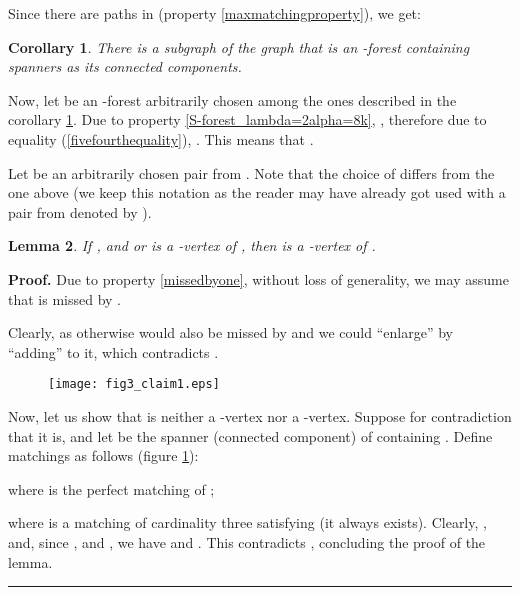 \documentclass[a4paper, 12pt]{article}
\newtheorem{lemma}{Lemma}[subsection]
\newtheorem{corollary}[lemma]{Corollary}
\newenvironment{proof}[1][Proof]{\noindent\textbf{#1.} }{\ \rule{0.5em}{0.5em}}
\begin{document}
Since there are  paths in 
(property \ref{maxmatchingproperty}), we get:
\begin{corollary}\label{subgraph_F}
There is a subgraph  of the graph  that is an -forest
containing  spanners as its connected
components.
\end{corollary}

 Now, let  be an -forest arbitrarily chosen among the ones described in the corollary \ref{subgraph_F}.
 Due to property \ref{S-forest_lambda=2alpha=8k}, , therefore due to equality (\ref{fivefourthequality}), . This means that .

\bigskip

Let  be an arbitrarily chosen pair from . Note that the choice of  differs from the one above
(we keep this notation as the reader may have already got used with
a pair from  denoted by ).

\vspace*{0.4cm}

\begin{lemma} \label{mandatory3-vertex}
If , and  or  is a
-vertex of , then  is a -vertex of .
\end{lemma}
\begin{proof}
Due to property \ref{missedbyone}, without loss of generality, we
may assume that  is missed by .

Clearly,  as otherwise  would also be missed by 
and we could ``enlarge''  by ``adding''  to it, which
contradicts .

\begin{figure}[h]
\begin{center}
\texttt{[image: fig3\_claim1.eps]}\\
\caption{}\label{fig_claim_mandatory3vertex}
\end{center}
\end{figure}

Now, let us show that  is neither a -vertex nor a -vertex.
Suppose for contradiction that it is, and let  be the spanner
(connected component) of  containing . Define matchings  as follows (figure \ref{fig_claim_mandatory3vertex}):

where  is the perfect matching of ;


where  is a matching of cardinality three satisfying  (it always exists). Clearly, , and, since ,  and , we have  and . This contradicts , concluding the proof
of the lemma.
\end{proof}
\end{document}
